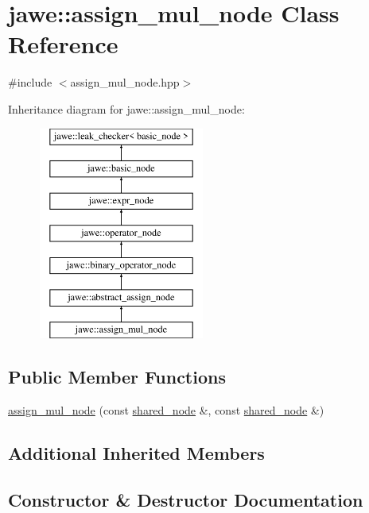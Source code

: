 \hypertarget{classjawe_1_1assign__mul__node}{}\section{jawe\+:\+:assign\+\_\+mul\+\_\+node Class Reference}
\label{classjawe_1_1assign__mul__node}


{\ttfamily \#include $<$assign\+\_\+mul\+\_\+node.\+hpp$>$}

Inheritance diagram for jawe\+:\+:assign\+\_\+mul\+\_\+node\+:\begin{figure}[H]
\begin{center}
\leavevmode
\includegraphics[height=7.000000cm]{classjawe_1_1assign__mul__node}
\end{center}
\end{figure}
\subsection*{Public Member Functions}
\begin{DoxyCompactItemize}
\item 
\hyperlink{classjawe_1_1assign__mul__node_a865cd6732dc4eb59ba3f280b5b171997}{assign\+\_\+mul\+\_\+node} (const \hyperlink{namespacejawe_a3f307481d921b6cbb50cc8511fc2b544}{shared\+\_\+node} \&, const \hyperlink{namespacejawe_a3f307481d921b6cbb50cc8511fc2b544}{shared\+\_\+node} \&)
\end{DoxyCompactItemize}
\subsection*{Additional Inherited Members}


\subsection{Constructor \& Destructor Documentation}
\mbox{\label{classjawe_1_1assign__mul__node_a865cd6732dc4eb59ba3f280b5b171997}} 
